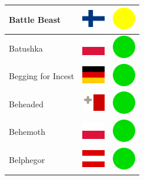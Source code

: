 \documentclass[12pt, a4paper, twoside]{report}
\begin{document}
\begin{center}
\begin{longtable}{|p{5cm}|p{2cm}|p{2cm}|}
 Battle Beast                                               & \includegraphics[width=1cm]{../4x3/fi} &   \includegraphics[width=1cm]{../likes/m} \\ \hline
 Batushka                                                   & \includegraphics[width=1cm]{../4x3/pl} &   \includegraphics[width=1cm]{../likes/y} \\ \hline
 Begging for Incest                                         & \includegraphics[width=1cm]{../4x3/de} &   \includegraphics[width=1cm]{../likes/y} \\ \hline
 Beheaded                                                   & \includegraphics[width=1cm]{../4x3/mt} &   \includegraphics[width=1cm]{../likes/y} \\ \hline
 Behemoth                                                   & \includegraphics[width=1cm]{../4x3/pl} &   \includegraphics[width=1cm]{../likes/y} \\ \hline
 Belphegor                                                  & \includegraphics[width=1cm]{../4x3/at} &   \includegraphics[width=1cm]{../likes/y} \\ \hline

\end{longtable}
\end{center}
\end{document}
